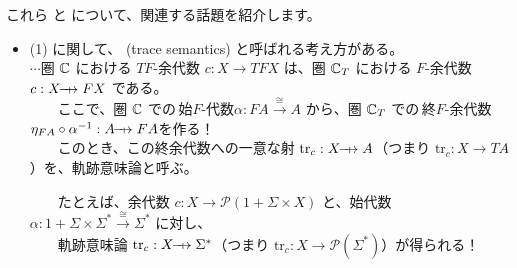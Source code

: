 \documentclass[
		head_space=20mm,
		foot_space=20mm,
		gutter=10mm,
		line_length=190mm
]{jlreq}
\begin{document}

\clearpage

\noindent これら  と  について、関連する話題を紹介します。\vspace{10pt}

\begin{itemize}
	\item (1) に関して、 (trace semantics) と呼ばれる考え方がある。\\ $\cdots$圏 $\mathbb{C}$ における $TF$-余代数 $c:X\to TFX$ は、圏 $\mathbb{C}_T$ における $F$-余代数 $c:X\computationrightarrow FX$ である。\\~~~~ここで、圏 $\mathbb{C}$ での\,始$F$-代数$\alpha:FA\xrightarrow{\;\cong\;}A$ から、圏 $\mathbb{C}_T$ での\,終$F$-余代数 $\eta_{FA}\circ\alpha^{-1}:A\computationrightarrow FA$を作る！ \\~~~~このとき、この終余代数への一意な射 $\mathrm{tr}_c:X\computationrightarrow A$（つまり $\mathrm{tr}_c:X\to TA$）を、軌跡意味論と呼ぶ。\vspace{5pt}
	\begin{center}
	\end{center}
	~~~~たとえば、余代数 $c:X\to\mathcal P(1+\Sigma\times X)$ と、始代数 $\alpha:1+\Sigma\times\Sigma^\ast\xrightarrow{\;\cong\;}\Sigma^\ast$ に対し、\\~~~~軌跡意味論 $\mathrm{tr}_c:X\computationrightarrow \Sigma^\ast$（つまり $\mathrm{tr}_c:X\to\mathcal P(\Sigma^\ast)$）が得られる！ \vspace{5pt}
	\begin{center}
	\end{center}\vspace{15pt}

\end{itemize}
\end{document}
